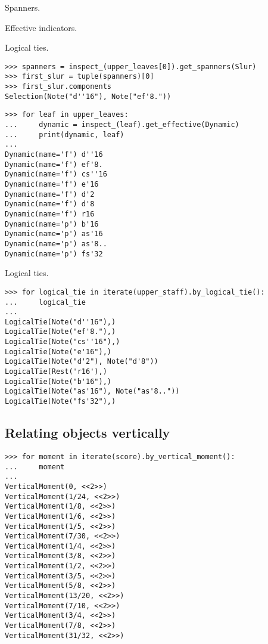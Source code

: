 Spanners.

Effective indicators.

Logical ties.

\begin{lstlisting}
>>> spanners = inspect_(upper_leaves[0]).get_spanners(Slur)
>>> first_slur = tuple(spanners)[0]
>>> first_slur.components
Selection(Note("d''16"), Note("ef'8."))
\end{lstlisting}


\begin{lstlisting}
>>> for leaf in upper_leaves:
...     dynamic = inspect_(leaf).get_effective(Dynamic)
...     print(dynamic, leaf)
... 
Dynamic(name='f') d''16
Dynamic(name='f') ef'8.
Dynamic(name='f') cs''16
Dynamic(name='f') e'16
Dynamic(name='f') d'2
Dynamic(name='f') d'8
Dynamic(name='f') r16
Dynamic(name='p') b'16
Dynamic(name='p') as'16
Dynamic(name='p') as'8..
Dynamic(name='p') fs'32
\end{lstlisting}


Logical ties.

\begin{lstlisting}
>>> for logical_tie in iterate(upper_staff).by_logical_tie():
...     logical_tie
... 
LogicalTie(Note("d''16"),)
LogicalTie(Note("ef'8."),)
LogicalTie(Note("cs''16"),)
LogicalTie(Note("e'16"),)
LogicalTie(Note("d'2"), Note("d'8"))
LogicalTie(Rest('r16'),)
LogicalTie(Note("b'16"),)
LogicalTie(Note("as'16"), Note("as'8.."))
LogicalTie(Note("fs'32"),)
\end{lstlisting}


\subsection{Relating objects vertically}

\begin{lstlisting}
>>> for moment in iterate(score).by_vertical_moment():
...     moment
... 
VerticalMoment(0, <<2>>)
VerticalMoment(1/24, <<2>>)
VerticalMoment(1/8, <<2>>)
VerticalMoment(1/6, <<2>>)
VerticalMoment(1/5, <<2>>)
VerticalMoment(7/30, <<2>>)
VerticalMoment(1/4, <<2>>)
VerticalMoment(3/8, <<2>>)
VerticalMoment(1/2, <<2>>)
VerticalMoment(3/5, <<2>>)
VerticalMoment(5/8, <<2>>)
VerticalMoment(13/20, <<2>>)
VerticalMoment(7/10, <<2>>)
VerticalMoment(3/4, <<2>>)
VerticalMoment(7/8, <<2>>)
VerticalMoment(31/32, <<2>>)
\end{lstlisting}

